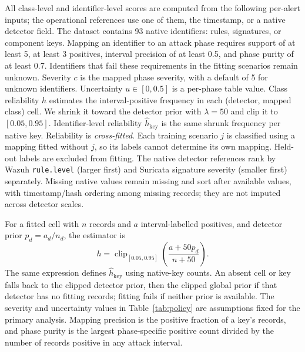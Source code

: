 \documentclass[pdflatex,sn-basic,Numbered]{sn-jnl}
\begin{document}
All class-level and identifier-level scores are computed from the following per-alert inputs; the operational references use one of them, the timestamp, or a native detector field. The dataset contains 93 native identifiers: rules, signatures, or component keys. Mapping an identifier to an attack phase requires support of at least 5, at least 3 positives, interval precision of at least 0.5, and phase purity of at least 0.7. Identifiers that fail these requirements in the fitting scenarios remain unknown. Severity $c$ is the mapped phase severity, with a default of 5 for unknown identifiers. Uncertainty $u \in [0, 0.5]$ is a per-phase table value. Class reliability $h$ estimates the interval-positive frequency in each (detector, mapped class) cell. We shrink it toward the detector prior with $\lambda=50$ and clip it to $[0.05, 0.95]$. Identifier-level reliability $\hat h_{\mathrm{key}}$ is the same shrunk frequency per native key. Reliability is \emph{cross-fitted}. Each training scenario $j$ is classified using a mapping fitted without $j$, so its labels cannot determine its own mapping. Held-out labels are excluded from fitting. The native detector references rank by Wazuh \texttt{rule.level} (larger first) and Suricata signature severity (smaller first) separately. Missing native values remain missing and sort after available values, with timestamp/hash ordering among missing records; they are not imputed across detector scales.

For a fitted cell with $n$ records and $a$ interval-labelled positives, and detector prior $p_d=a_d/n_d$, the estimator is
\begin{equation}
 h=\operatorname{clip}_{[0.05,0.95]}\!\left(\frac{a+50p_d}{n+50}\right).
\end{equation}
The same expression defines $\hat h_{\mathrm{key}}$ using native-key counts. An absent cell or key falls back to the clipped detector prior, then the clipped global prior if that detector has no fitting records; fitting fails if neither prior is available. The severity and uncertainty values in Table~\ref{tab:policy} are assumptions fixed for the primary analysis. Mapping precision is the positive fraction of a key's records, and phase purity is the largest phase-specific positive count divided by the number of records positive in any attack interval.

\begin{table}[t]
\centering
\caption{Author-defined primary input policy. Critical intervals have severity at least 8. The unknown row applies to identifiers rejected by the training-only phase mapping.}
\label{tab:policy}
\small
\unskip
\end{table}
\end{document}
